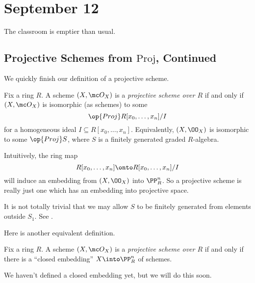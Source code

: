 \documentclass[../notes.tex]{subfiles}
\begin{document}
\section{September 12}

The classroom is emptier than usual.

\subsection{Projective Schemes from \texorpdfstring{$\mathrm{Proj}$}{Proj}, Continued}
We quickly finish our definition of a projective scheme.
\begin{definition}
	Fix a ring $R$. A scheme $(X,\mc O_X)$ is a \textit{projective scheme over $R$} if and only if $(X,\mc O_X)$ is isomorphic (as schemes) to some
	\[\op{Proj}R[x_0,\ldots,x_n]/I\]
	for a homogeneous ideal $I\subseteq R[x_0,\ldots,x_n]$. Equivalently, $(X,\OO_X)$ is isomorphic to some $\op{Proj}S$, where $S$ is a finitely generated graded $R$-algebra.
\end{definition}
Intuitively, the ring map
\[R[x_0,\ldots,x_n]\onto R[x_0,\ldots,x_n]/I\]
will induce an embedding from $(X,\OO_X)$ into $\PP^n_R$. So a projective scheme is really just one which has an embedding into projective space.
\begin{remark}
	It is not totally trivial that we may allow $S$ to be finitely generated from elements outside $S_1$. See \cite[Section~7.4.4]{rising-sea}.
\end{remark}
Here is another equivalent definition.
\begin{definition}
	Fix a ring $R$. A scheme $(X,\mc O_X)$ is a \textit{projective scheme over $R$} if and only if there is a ``closed embedding'' $X\into\PP^n_R$ of schemes.
\end{definition}
We haven't defined a closed embedding yet, but we will do this soon.
\end{document}
